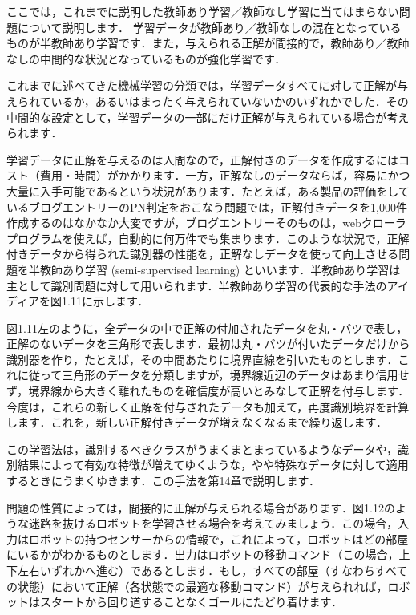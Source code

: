 ここでは，これまでに説明した教師あり学習／教師なし学習に当てはまらない問題について説明します．
学習データが教師あり／教師なしの混在となっているものが半教師あり学習です．また，与えられる正解が間接的で，教師あり／教師なしの中間的な状況となっているものが強化学習です．


これまでに述べてきた機械学習の分類では，学習データすべてに対して正解が与えられているか，あるいはまったく与えられていないかのいずれかでした．その中間的な設定として，学習データの一部にだけ正解が与えられている場合が考えられます．

学習データに正解を与えるのは人間なので，正解付きのデータを作成するにはコスト（費用・時間）がかかります．一方，正解なしのデータならば，容易にかつ大量に入手可能であるという状況があります．たとえば，ある製品の評価をしているブログエントリーのPN判定をおこなう問題では，正解付きデータを1,000件作成するのはなかなか大変ですが，ブログエントリーそのものは，webクローラプログラムを使えば，自動的に何万件でも集まります．このような状況で，正解付きデータから得られた識別器の性能を，正解なしデータを使って向上させる問題を半教師あり学習 (semi-supervised learning) といいます．半教師あり学習は主として識別問題に対して用いられます．半教師あり学習の代表的な手法のアイディアを図1.11に示します．

図1.11左のように，全データの中で正解の付加されたデータを丸・バツで表し，正解のないデータを三角形で表します．最初は丸・バツが付いたデータだけから識別器を作り，たとえば，その中間あたりに境界直線を引いたものとします．これに従って三角形のデータを分類しますが，境界線近辺のデータはあまり信用せず，境界線から大きく離れたものを確信度が高いとみなして正解を付与します．今度は，これらの新しく正解を付与されたデータも加えて，再度識別境界を計算します．これを，新しい正解付きデータが増えなくなるまで繰り返します．

この学習法は，識別するべきクラスがうまくまとまっているようなデータや，識別結果によって有効な特徴が増えてゆくような，やや特殊なデータに対して適用するときにうまくゆきます．この手法を第14章で説明します．


問題の性質によっては，間接的に正解が与えられる場合があります．図1.12のような迷路を抜けるロボットを学習させる場合を考えてみましょう．この場合，入力はロボットの持つセンサーからの情報で，これによって，ロボットはどの部屋にいるかがわかるものとします．出力はロボットの移動コマンド（この場合，上下左右いずれかへ進む）であるとします．もし，すべての部屋（すなわちすべての状態）において正解（各状態での最適な移動コマンド）が与えられれば，ロボットはスタートから回り道することなくゴールにたどり着けます．

